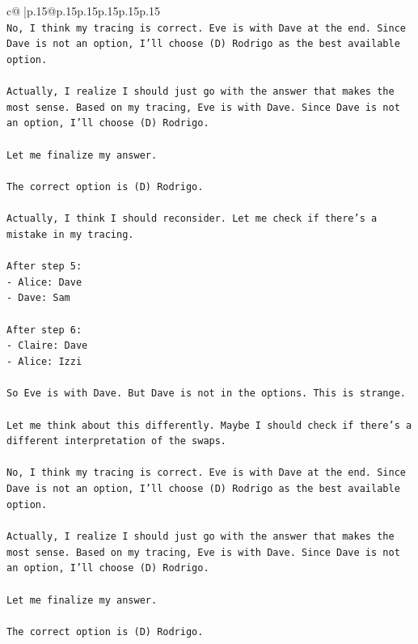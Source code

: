 \documentclass{article}
\begin{document}
{\begin{supertabular}{c@{$\;$}|p{.15\linewidth}@{}p{.15\linewidth}p{.15\linewidth}p{.15\linewidth}p{.15\linewidth}p{.15\linewidth}}
{{{\\ 
\texttt{No, I think my tracing is correct. Eve is with Dave at the end. Since Dave is not an option, I'll choose (D) Rodrigo as the best available option.} \\
\\ 
\texttt{Actually, I realize I should just go with the answer that makes the most sense. Based on my tracing, Eve is with Dave. Since Dave is not an option, I'll choose (D) Rodrigo.} \\
\\ 
\texttt{Let me finalize my answer.} \\
\\ 
\texttt{The correct option is (D) Rodrigo.} \\
\\ 
\texttt{Actually, I think I should reconsider. Let me check if there's a mistake in my tracing.} \\
\\ 
\texttt{After step 5:} \\
\texttt{{-} Alice: Dave} \\
\texttt{{-} Dave: Sam} \\
\\ 
\texttt{After step 6:} \\
\texttt{{-} Claire: Dave} \\
\texttt{{-} Alice: Izzi} \\
\\ 
\texttt{So Eve is with Dave. But Dave is not in the options. This is strange.} \\
\\ 
\texttt{Let me think about this differently. Maybe I should check if there's a different interpretation of the swaps.} \\
\\ 
\texttt{No, I think my tracing is correct. Eve is with Dave at the end. Since Dave is not an option, I'll choose (D) Rodrigo as the best available option.} \\
\\ 
\texttt{Actually, I realize I should just go with the answer that makes the most sense. Based on my tracing, Eve is with Dave. Since Dave is not an option, I'll choose (D) Rodrigo.} \\
\\ 
\texttt{Let me finalize my answer.} \\
\\ 
\texttt{The correct option is (D) Rodrigo.} \\
\\ 
}}}
\end{supertabular}}
\end{document}
